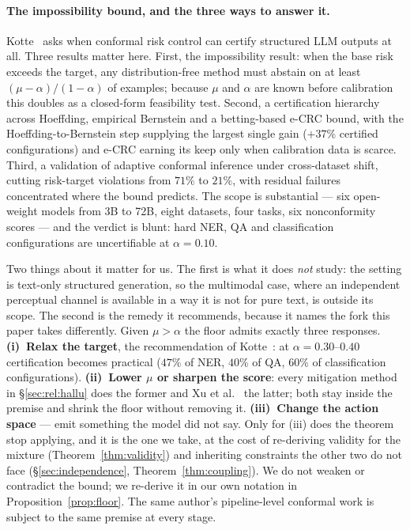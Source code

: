 \documentclass[review,number,doubleblind]{elsarticle}
\theoremstyle{plain}
\theoremstyle{definition}
\theoremstyle{remark}
\begin{document}
\paragraph{The impossibility bound, and the three ways to answer it.}
Kotte~\cite{crcimposs} asks when conformal risk control can certify structured LLM outputs at
all. Three results matter here. First, the impossibility result: when the base risk exceeds
the target, any distribution-free method must abstain on at least $(\mu-\alpha)/(1-\alpha)$ of
examples; because $\mu$ and $\alpha$ are known before calibration this doubles as a
closed-form feasibility test. Second, a certification hierarchy across Hoeffding, empirical
Bernstein and a betting-based e-CRC bound, with the Hoeffding-to-Bernstein step supplying the
largest single gain ($+37\%$ certified configurations) and e-CRC earning its keep only when
calibration data is scarce. Third, a validation of adaptive conformal inference under
cross-dataset shift, cutting risk-target violations from $71\%$ to $21\%$, with residual
failures concentrated where the bound predicts. The scope is substantial --- six open-weight
models from 3B to 72B, eight datasets, four tasks, six nonconformity scores --- and the verdict
is blunt: hard NER, QA and classification configurations are uncertifiable at $\alpha=0.10$.

Two things about it matter for us. The first is what it does \emph{not} study: the setting is
text-only structured generation, so the multimodal case, where an independent perceptual
channel is available in a way it is not for pure text, is outside its scope. The second is the
remedy it recommends, because it names the fork this paper takes differently. Given $\mu>\alpha$
the floor admits exactly three responses. \textbf{(i)~Relax the target}, the recommendation of
Kotte~\cite{crcimposs}: at $\alpha=0.30$--$0.40$ certification becomes practical ($47\%$ of NER,
$40\%$ of QA, $60\%$ of classification configurations). \textbf{(ii)~Lower $\mu$ or sharpen the
score}: every mitigation method in \S\ref{sec:rel:hallu} does the former and Xu et al.~\cite{bcea} the
latter; both stay inside the premise and shrink the floor without removing it.
\textbf{(iii)~Change the action space} --- emit something the model did not say. Only for (iii)
does the theorem stop applying, and it is the one we take, at the cost of re-deriving validity
for the mixture (Theorem~\ref{thm:validity}) and inheriting constraints the other two do not
face (\S\ref{sec:independence}, Theorem~\ref{thm:coupling}). We do not weaken or contradict the
bound; we re-derive it in our own notation in Proposition~\ref{prop:floor}. The same author's
pipeline-level conformal work \citep{pasc} is subject to the same premise at every stage.
\end{document}
